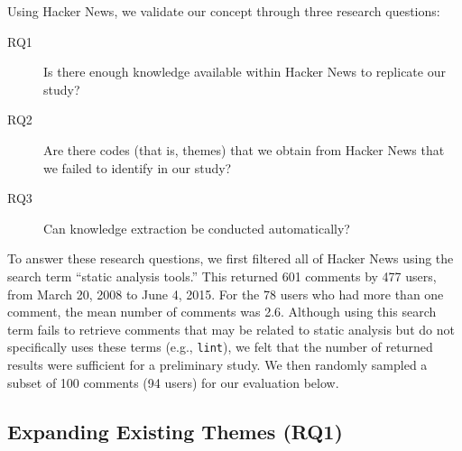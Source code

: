 \documentclass{sig-alternate}
\begin{document}
Using Hacker News, we validate our concept through three research questions:

\begin{description}
\item[RQ1] Is there enough knowledge available within Hacker News to replicate our study?
\item[RQ2] Are there codes (that is, themes) that we obtain from Hacker News that we failed to identify in our study?
\item[RQ3] Can knowledge extraction be conducted automatically?
\end{description}









To answer these research questions, we first filtered all of Hacker News using the search term ``static analysis tools.'' This returned 601 comments by 477 users, from March 20, 2008 to June 4, 2015. For the 78 users who had more than one comment, the mean number of comments was 2.6. Although using this search term fails to retrieve comments that may be related to static analysis but do not specifically uses these terms (e.g., \texttt{lint}), we felt that the number of returned results were sufficient for a preliminary study. We then randomly sampled a subset of 100 comments (94 users) for our evaluation below.


\subsection{Expanding Existing Themes (RQ1)}
\end{document}
